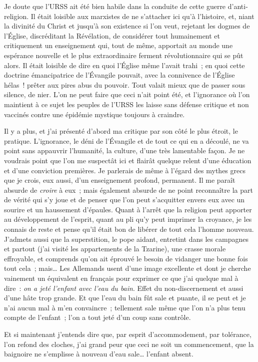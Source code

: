 \documentclass[twoside]{book} %
\begin{document}
\noindent Je doute que l’URSS ait été bien habile dans la conduite de cette guerre d’anti-religion. Il était loisible aux marxistes de ne s’attacher ici qu’à l’histoire, et, niant la divinité du Christ et jusqu’à son existence si l’on veut, rejetant les dogmes de l’Église, discréditant la Révélation, de considérer tout humainement et critiquement un enseignement qui, tout de même, apportait au monde une espérance nouvelle et le plus extraordinaire ferment révolutionnaire qui se pût alors. Il était loisible de dire en quoi l’Église même l’avait trahi ; en quoi cette doctrine émancipatrice de l’Évangile pouvait, avec la connivence de l’Église hélas ! prêter aux pires abus du pouvoir. Tout valait mieux que de passer sous silence, de nier. L’on ne peut faire que ceci n’ait point été, et l’ignorance où l’on maintient à ce sujet les peuples de l’URSS les laisse sans défense critique et non vaccinés contre une épidémie mystique toujours à craindre.\par
Il y a plus, et j’ai présenté d’abord ma critique par son côté le plus étroit, le pratique. L’ignorance, le déni de l’Évangile et de tout ce qui en a découlé, ne va point sans appauvrir l’humanité, la culture, d’une très lamentable façon. Je ne voudrais point que l’on me suspectât ici et flairât quelque relent d’une éducation et d’une conviction premières. Je parlerais de même à l’égard des mythes grecs que je crois, eux aussi, d’un enseignement profond, permanent. Il me paraît absurde de \emph{croire} à eux ; mais également absurde de ne point reconnaître la part de vérité qui s’y joue et de penser que l’on peut s’acquitter envers eux avec un sourire et un haussement d’épaules. Quant à l’arrêt que la religion peut apporter au développement de l’esprit, quant au pli qu’y peut imprimer la croyance, je les connais de reste et pense qu’il était bon de libérer de tout cela l’homme nouveau. J’admets aussi que la superstition, le pope aidant, entretint dans les campagnes et partout (j’ai visité les appartements de la Tzarine), une crasse morale effroyable, et comprends qu’on ait éprouvé le besoin de vidanger une bonne fois tout cela ; mais… Les Allemands usent d’une image excellente et dont je cherche vainement un équivalent en français pour exprimer ce que j’ai quelque mal à dire : \emph{on a jeté l’enfant avec l’eau du bain}. Effet du non-discernement et aussi d’une hâte trop grande. Et que l’eau du bain fût sale et puante, il se peut et je n’ai aucun mal à m’en convaincre ; tellement sale même que l’on n’a plus tenu compte de l’enfant ; l’on a tout jeté d’un coup sans contrôle.\par
Et si maintenant j’entends dire que, par esprit d’accommodement, par tolérance, l’on refond des cloches, j’ai grand peur que ceci ne soit un commencement, que la baignoire ne s’emplisse à nouveau d’eau sale… l’enfant absent.
\end{document}
